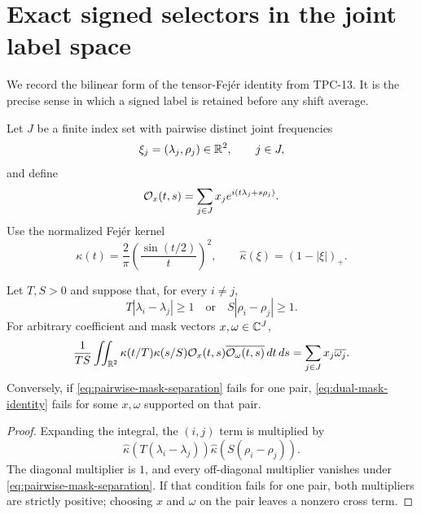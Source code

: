 \section{Exact signed selectors in the joint label space}
\label{sec:dual-selectors}

We record the bilinear form of the tensor-Fej\'er identity from TPC-13.  It
is the precise sense in which a signed label is retained before any shift
average.

Let $J$ be a finite index set with pairwise distinct joint frequencies
\begin{equation}
 \xi_j=(\lambda_j,\rho_j)\in\mathbb R^2,
 \qquad j\in J,
 \label{eq:abstract-joint-frequencies}
\end{equation}
and define
\begin{equation}
 \mathcal O_x(t,s)=\sum_{j\in J}x_j e^{i(t\lambda_j+s\rho_j)}.
 \label{eq:abstract-observation}
\end{equation}
Use the normalized Fej\'er kernel
\begin{equation}
 \kappa(t)=\frac2\pi\left(\frac{\sin(t/2)}t\right)^2,
 \qquad
 \widehat\kappa(\xi)=(1-|\xi|)_+.
 \label{eq:fejer-kernel}
\end{equation}

\begin{proposition}
\label{prop:dual-mask-identity}
Let $T,S>0$ and suppose that, for every $i\ne j$,
\begin{equation}
 T|\lambda_i-\lambda_j|\geq1
 \quad\text{or}\quad
 S|\rho_i-\rho_j|\geq1.
 \label{eq:pairwise-mask-separation}
\end{equation}
For arbitrary coefficient and mask vectors $x,\omega\in\mathbb C^J$,
\begin{equation}
 \frac1{TS}\iint_{\mathbb R^2}
 \kappa(t/T)\kappa(s/S)
 \mathcal O_x(t,s)\overline{\mathcal O_\omega(t,s)}\,dt\,ds
 =\sum_{j\in J}x_j\overline{\omega_j}.
 \label{eq:dual-mask-identity}
\end{equation}
Conversely, if \eqref{eq:pairwise-mask-separation} fails for one pair,
\eqref{eq:dual-mask-identity} fails for some $x,\omega$ supported on that
pair.
\end{proposition}

\begin{proof}
Expanding the integral, the $(i,j)$ term is multiplied by
\[
 \widehat\kappa(T(\lambda_i-\lambda_j))
 \widehat\kappa(S(\rho_i-\rho_j)).
\]
The diagonal multiplier is $1$, and every off-diagonal multiplier vanishes
under \eqref{eq:pairwise-mask-separation}.  If that condition fails for one
pair, both multipliers are strictly positive; choosing $x$ and $\omega$ on
the pair leaves a nonzero cross term.
\end{proof}

